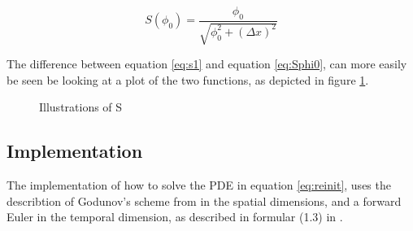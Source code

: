\begin{equation}
\label{eq:Sphi0}
S(\phi_0) = \frac{\phi_0}{\sqrt{\phi_0^2 + (\Delta x)^2}}
\end{equation}

The difference between equation \eqref{eq:s1} and equation
\eqref{eq:Sphi0}, can more easily be seen be looking at a plot of the
two functions, as depicted in figure \ref{fig:s-graph}.

\begin{figure}[h]
\begin{center}
\end{center}
\caption{Illustrations of S}
\label{fig:s-graph}
\end{figure}



\pagebreak
\subsection{Implementation}
The implementation of how to solve the PDE in equation \eqref{eq:reinit},
uses the describtion of Godunov's scheme from
 in the spatial dimensions, and a
forward Euler in the temporal dimension, as described in formular
(1.3) in .

